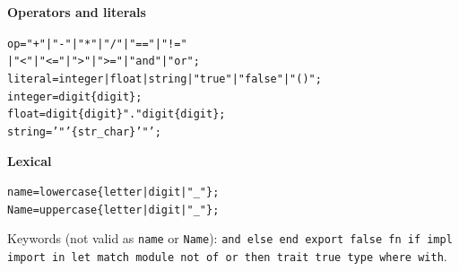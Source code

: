 \documentclass[10pt,a4paper]{article}
\theoremstyle{plain}
\theoremstyle{definition}
\theoremstyle{remark}
\begin{document}
\medskip\noindent\textbf{Operators and literals}
{\small\begin{alltt}
op      = "+" | "-" | "*" | "/" | "==" | "!="
        | "<" | "<=" | ">" | ">=" | "and" | "or" ;
literal = integer | float | string | "true" | "false" | "()" ;
integer = digit \{ digit \} ;
float   = digit \{ digit \} "." digit \{ digit \} ;
string  = '"' \{ str_char \} '"' ;
\end{alltt}}

\medskip\noindent\textbf{Lexical}
{\small\begin{alltt}
name = lowercase \{ letter | digit | "_" \} ;
Name = uppercase \{ letter | digit | "_" \} ;
\end{alltt}}
\noindent Keywords (not valid as \texttt{name} or \texttt{Name}):
\texttt{and else end export false fn if impl import in let match
module not of or then trait true type where with}.
\end{document}
